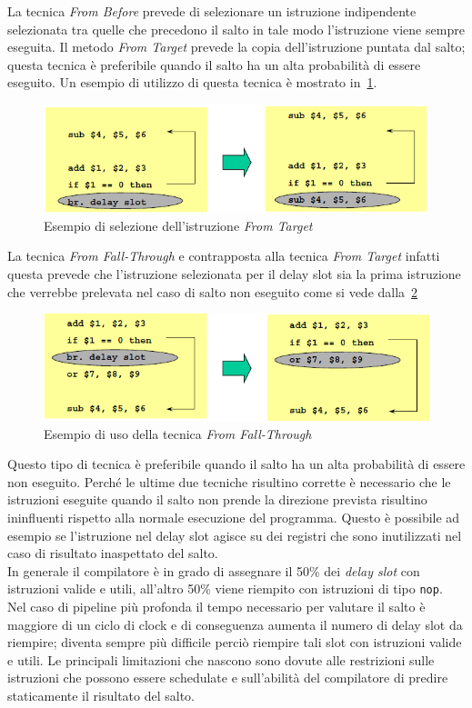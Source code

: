 La tecnica \emph{From Before} prevede di selezionare un istruzione indipendente selezionata tra quelle che precedono il salto in tale modo l'istruzione viene sempre eseguita. Il metodo \emph{From Target} prevede la copia dell'istruzione puntata dal salto; questa tecnica è preferibile quando il salto ha un alta probabilità di essere eseguito. Un esempio di utilizzo di questa tecnica è mostrato in \figurename\,\ref{fig:fromtarget}.
\begin{figure}[htb]
\centering
\includegraphics[scale=0.5]{img/fromtarget.png}
\caption{Esempio di selezione dell'istruzione \emph{From Target}}\label{fig:fromtarget}
\end{figure}
La tecnica \emph{From Fall-Through} e contrapposta alla tecnica \emph{From Target} infatti questa prevede che l'istruzione selezionata per il delay slot sia la prima istruzione che verrebbe prelevata nel caso di salto non eseguito come si vede dalla \figurename\,\ref{fig:fromfall}
\begin{figure}[htb]
\centering
\includegraphics[scale=0.5]{img/fromfall.png}
\caption{Esempio di uso della tecnica \emph{From Fall-Through}}\label{fig:fromfall}
\end{figure}
Questo tipo di tecnica è preferibile quando il salto ha un alta probabilità di essere non eseguito.
Perché le ultime due tecniche risultino corrette è necessario che le istruzioni eseguite quando il salto non prende la direzione prevista risultino ininfluenti rispetto alla normale esecuzione del programma. Questo è possibile ad esempio se l'istruzione nel delay slot agisce su dei registri che sono inutilizzati nel caso di risultato inaspettato del salto.\\
In generale il compilatore è in grado di assegnare il 50\% dei \emph{delay slot} con istruzioni valide e utili, all'altro 50\% viene riempito con istruzioni di tipo \texttt{nop}. Nel caso di pipeline più profonda il tempo necessario per valutare il salto è maggiore di un ciclo di clock e di conseguenza aumenta il numero di delay slot da riempire; diventa sempre più difficile perciò riempire tali slot con istruzioni valide e utili. Le principali limitazioni che nascono sono dovute alle restrizioni sulle istruzioni che possono essere schedulate e sull'abilità del compilatore di predire staticamente il risultato del salto.\\
